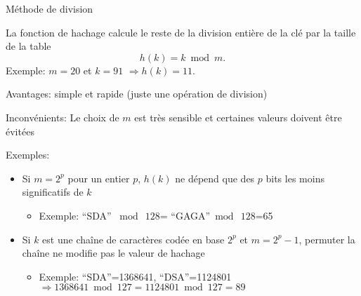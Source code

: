 \begin{frame}{Méthode de division}

La fonction de hachage calcule le reste de la division entière de la clé par la taille de la table
$$h(k)=k\bmod m.$$
Exemple: $m=20$ et $k=91$ $\Rightarrow h(k)=11$.

\bigskip

\alert{Avantages:} simple et rapide (juste une opération de division)

\bigskip

\alert{Inconvénients:} Le choix de $m$ est très sensible et certaines valeurs doivent être évitées

\bigskip

Exemples:
\begin{itemize}
\item Si $m=2^p$ pour un entier $p$, $h(k)$ ne dépend que des $p$ bits
  les moins significatifs de $k$\\
\begin{itemize}
\item Exemple: ``SDA'' $\bmod\ 128$= ``GAGA''$\bmod\ 128$=65
\end{itemize}
\item Si $k$ est une chaîne de caractères codée en base $2^p$ et $m=2^p-1$, permuter la chaîne ne modifie pas le valeur de hachage\\
\begin{itemize}
\item Exemple: ``SDA''=1368641, ``DSA''=1124801\\
$\Rightarrow 1368641\bmod 127=1124801\bmod 127=89$
\end{itemize}
\end{itemize}
\end{frame}

